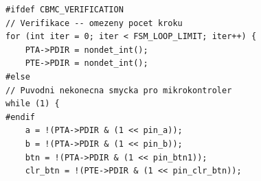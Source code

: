 \documentclass[a4paper, 11pt]{article}
\begin{document}
\begin{listing}[H]
    \caption{Část původního kódu implementující stavový automat využívající  registry definované pro analýzu. Navíc je uveden limit pro počet iterací cyklu, který reprezentuje maximální délku posloupnosti jednotlivých akcí, které uživatel provede s~rotačním enkodérem.}
    \label{lst:IMP_FSM_VerificationLoop}
    \begin{verbatim}
#ifdef CBMC_VERIFICATION
// Verifikace -- omezeny pocet kroku
for (int iter = 0; iter < FSM_LOOP_LIMIT; iter++) {
    PTA->PDIR = nondet_int();
    PTE->PDIR = nondet_int();
#else
// Puvodni nekonecna smycka pro mikrokontroler
while (1) {
#endif
    a = !(PTA->PDIR & (1 << pin_a));
    b = !(PTA->PDIR & (1 << pin_b));
    btn = !(PTA->PDIR & (1 << pin_btn1));
    clr_btn = !(PTE->PDIR & (1 << pin_clr_btn));
    \end{verbatim}
\end{listing}
\end{document}
